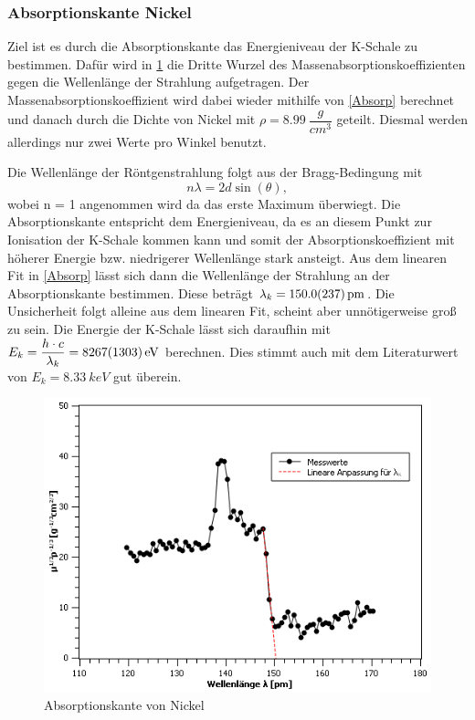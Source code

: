 \documentclass[
	a4paper,
	12pt,
	pagesize,
	ngerman
]{scrartcl}
\begin{document}
\subsubsection{Absorptionskante Nickel}
\label{Ni}
Ziel ist es durch die Absorptionskante das Energieniveau der K-Schale zu bestimmen. Dafür wird in \cref{Kante} die Dritte Wurzel des Massenabsorptionskoeffizienten gegen die Wellenlänge der Strahlung aufgetragen. Der Massenabsorptionskoeffizient wird dabei wieder mithilfe von \cref{Absorp} berechnet und danach durch die Dichte von Nickel mit $\rho = \SI{8,99}{\dfrac{g}{cm^{3}}}$ geteilt. Diesmal werden allerdings nur zwei Werte pro Winkel benutzt.

Die Wellenlänge der Röntgenstrahlung folgt aus der Bragg-Bedingung mit
\begin{equation}
n \lambda = 2 d \sin(\theta),
\end{equation}
wobei n = 1 angenommen wird da das erste Maximum überwiegt. Die Absorptionskante entspricht dem Energieniveau, da es an diesem Punkt zur Ionisation der K-Schale kommen kann und somit der Absorptionskoeffizient mit höherer Energie bzw. niedrigerer Wellenlänge stark ansteigt. Aus dem linearen Fit in \cref{Absorp} lässt sich dann die Wellenlänge der Strahlung an der Absorptionskante bestimmen. Diese beträgt $\lambda_{k} = \SI{150,0 \pm 23,7}{pm}$. Die Unsicherheit folgt alleine aus dem linearen Fit, scheint aber unnötigerweise groß zu sein. Die Energie der K-Schale lässt sich daraufhin mit $E_{k} = \dfrac{h \cdot c}{\lambda_{k}} = \SI{8267 \pm 1303}{eV}$ berechnen. Dies stimmt auch mit dem Literaturwert von $E_{k} = \SI{8,33}{keV}$ gut überein.


\begin{figure}[h!]
	\centering
	\includegraphics[scale = 1]{Absorptionskante.png}
	\caption{Absorptionskante von Nickel}
	\label{Kante}
\end{figure}
\end{document}
